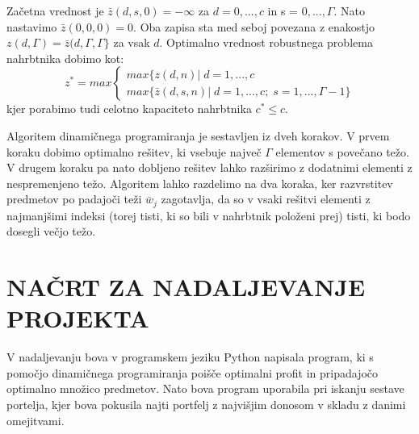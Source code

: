 \documentclass[a4paper,12pt]{article}
\begin{document}
\noindent Začetna vrednost je $\bar{z}(d, s, 0) = -\infty$ za $d = 0,...,c$ in s = $0,..., \Gamma$. 
Nato nastavimo $\bar{z}(0, 0, 0) = 0$. Oba zapisa sta med seboj povezana z enakostjo $z(d, \Gamma) = 
\bar{z}(d, \Gamma, \Gamma\}$ za vsak $d$. Optimalno vrednost robustnega problema nahrbtnika dobimo kot:
\begin{equation}
\tag*{}
z^{*} = max \begin{cases}
max\{z(d, n) |\; d = 1, ..., c \\
max\{\bar{z}(d, s, n) |\; d = 1, ..., c; \;s = 1, ..., \Gamma -1\}
\end{cases}
\end{equation}
kjer porabimo tudi celotno kapaciteto nahrbtnika $c^{*} \leq c$.
\par
Algoritem dinamičnega programiranja je sestavljen iz dveh korakov. V prvem koraku dobimo optimalno 
rešitev, ki vsebuje največ $\Gamma$ elementov s povečano težo. V drugem koraku pa nato dobljeno 
rešitev lahko razširimo z dodatnimi elementi z nespremenjeno težo. Algoritem lahko razdelimo na dva 
koraka, ker razvrstitev predmetov po padajoči teži $\bar{w}_j$ zagotavlja, da so v vsaki rešitvi 
elementi z najmanjšimi indeksi (torej tisti, ki so bili v nahrbtnik položeni prej) tisti, ki bodo 
dosegli večjo težo.

\section{NAČRT ZA NADALJEVANJE PROJEKTA}
V nadaljevanju bova v programskem jeziku Python napisala program, ki s pomočjo dinamičnega programiranja 
poišče optimalni profit in pripadajočo optimalno množico predmetov. Nato bova program uporabila pri iskanju 
sestave portelja, kjer bova pokusila najti portfelj z najvišjim donosom v skladu z danimi omejitvami.
\end{document}
